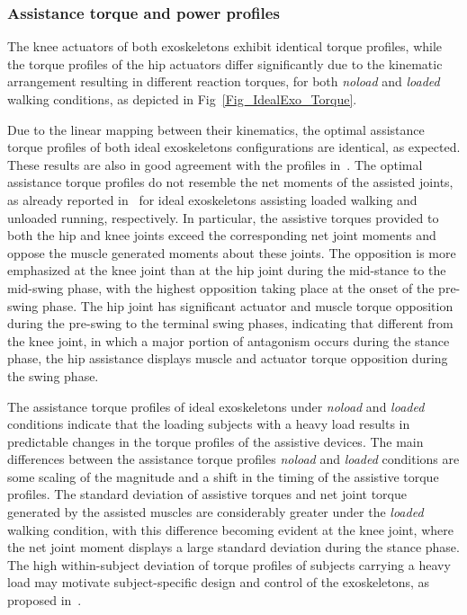 \documentclass[10pt,letterpaper]{article}
\begin{document}
\subsubsection*{Assistance torque and power profiles}

The knee actuators of both exoskeletons exhibit identical torque profiles, while the torque profiles of the hip actuators differ significantly due to the kinematic arrangement resulting in different reaction torques, for both \textit{noload} and \textit{loaded} walking conditions, as depicted in Fig~\ref{Fig_IdealExo_Torque}.

Due to the linear mapping between their kinematics, the optimal assistance torque profiles of both ideal exoskeletons configurations are identical, as expected.
These results are also in good agreement with the profiles in~\cite{Dembia2017,Uchida2016_idealexo_running}. The optimal assistance torque profiles do not resemble the net moments of the assisted joints, as already reported in~\cite{Dembia2017,Uchida2016_idealexo_running} for ideal exoskeletons assisting loaded walking and unloaded running, respectively. In particular, the assistive torques provided to both the hip and knee joints exceed the corresponding net joint moments and oppose the muscle generated moments about these joints. The opposition is more emphasized at the knee joint than at the hip joint during the mid-stance to the mid-swing phase, with the highest opposition taking place at the onset of the pre-swing phase. The hip joint has significant actuator and muscle torque opposition during the pre-swing to the terminal swing phases, indicating that different from the knee joint, in which a major portion of antagonism occurs during the stance phase, the hip assistance displays  muscle and actuator torque opposition during the swing phase.

The assistance torque profiles of ideal exoskeletons under \textit{noload} and \textit{loaded} conditions indicate that the loading subjects with a heavy load results in predictable changes in the torque profiles of the assistive devices. The main differences between the assistance torque profiles \textit{noload} and \textit{loaded} conditions are some scaling of the magnitude and a shift in the timing  of the assistive torque profiles. The standard deviation of assistive torques and net joint torque generated by the assisted muscles are considerably greater under the \textit{loaded} walking condition, with this difference becoming evident at the knee joint, where the net joint moment displays a large standard deviation during the stance phase. The high within-subject deviation of torque profiles of subjects carrying a heavy load may motivate subject-specific design and control of the exoskeletons, as proposed in~\cite{Uchida2016_idealexo_running}.
\end{document}
